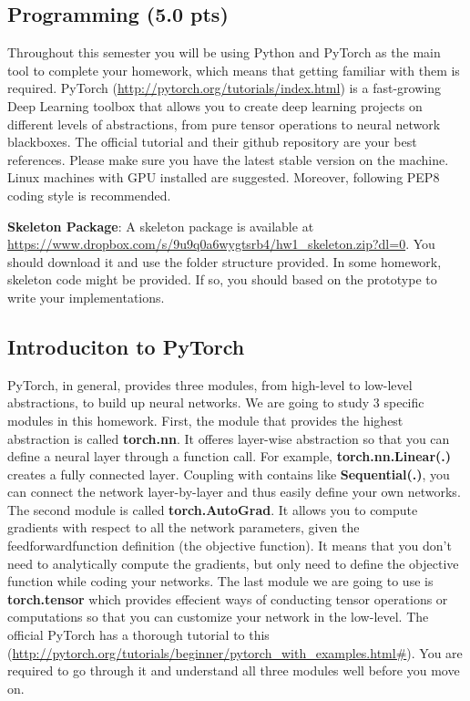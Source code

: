 \documentclass{article}
\begin{document}

\newpage
\subsection*{Programming (5.0 pts)}

Throughout this semester you will be using Python and PyTorch as the main tool
to complete your homework, which means that getting familiar with them is required.
PyTorch (\url{http://pytorch.org/tutorials/index.html}) is a fast-growing
Deep Learning toolbox that allows you to create deep learning projects on
different levels of abstractions, from pure tensor operations to neural network
blackboxes. The official tutorial and their github
repository are your best references. Please make sure you have the latest stable version on the machine.
Linux machines with GPU installed are suggested. Moreover, following PEP8 coding style is recommended.

\hfill

\noindent \textbf{Skeleton Package}: A skeleton package is available at\\
 \url{https://www.dropbox.com/s/9u9q0a6wygtsrb4/hw1_skeleton.zip?dl=0}. You should download it and use the folder structure provided. In some homework, skeleton code might be provided. If so, you should based on the prototype to write your implementations.

\subsection*{Introduciton to PyTorch}

PyTorch, in general, provides three modules, from high-level to low-level abstractions, to build up neural networks. We are going to study 3 specific modules in this homework. First, the module that provides the highest abstraction is called \textbf{torch.nn}. It offeres layer-wise abstraction so that you can define a neural layer through a function call. For example, \textbf{torch.nn.Linear(.)} creates a fully connected layer. Coupling with contains like \textbf{Sequential(.)}, you can connect the network layer-by-layer and thus easily define your own networks. The second module is called \textbf{torch.AutoGrad}. It allows you to compute gradients with respect to all the network parameters, given the feedforwardfunction definition (the objective function). It means that you don't need to analytically compute the gradients, but only need to define the objective function while coding your networks. The last module we are going to use is \textbf{torch.tensor} which provides effecient ways of conducting tensor operations or computations so that you can customize your network in the low-level. The official PyTorch has a thorough tutorial to this (\url{http://pytorch.org/tutorials/beginner/pytorch_with_examples.html#}). You are required to go through it and understand all three modules well before you move on.
\end{document}
